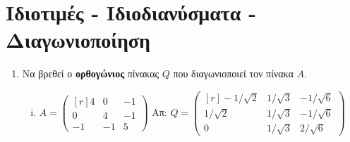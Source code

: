 \documentclass[a4paper,table]{report}
\begin{document}
\section*{Ιδιοτιμές - Ιδιοδιανύσματα - Διαγωνιοποίηση}


\begin{enumerate}
  \item Να βρεθεί ο \textbf{ορθογώνιος} πίνακας $Q$ που διαγωνιοποιεί τον πίνακα $A$. 

    \begin{enumerate}[i)]
      \item $ A = 
        \begin{pmatrix*}[r]
          4 & 0 & -1 \\
          0 & 4 & -1 \\
          -1 & -1 & 5
        \end{pmatrix*} $ \hfill Απ: $ Q = 
        \begin{pmatrix*}[r]
          -1/ \sqrt{2} & 1 / \sqrt{3} & - 1 / \sqrt{6} \\ 
          1/ \sqrt{2} & 1 / \sqrt{3} & - 1 / \sqrt{6} \\ 
          0 & 1 / \sqrt{3} &  2 / \sqrt{6} 
        \end{pmatrix*} $ 
    \end{enumerate}
\end{enumerate}
\end{document}
